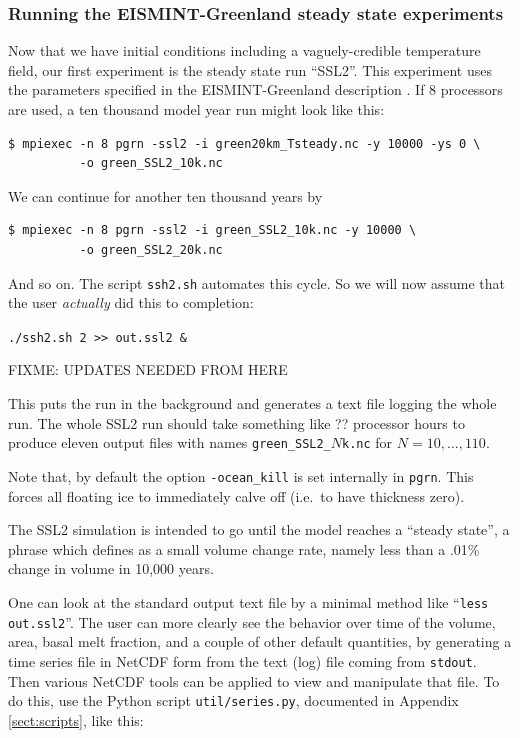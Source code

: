 \documentclass[11pt,final]{amsart}
\begin{document}
\subsubsection*{Running the EISMINT-Greenland steady state experiments}  Now that we have initial conditions including a vaguely-credible temperature field, our first experiment is the steady state run ``SSL2''.  This experiment uses the parameters specified in the EISMINT-Greenland description \cite{RitzEISMINT}.  If 8 processors are used, a ten thousand model year run might look like this:

\begin{verbatim}
$ mpiexec -n 8 pgrn -ssl2 -i green20km_Tsteady.nc -y 10000 -ys 0 \
          -o green_SSL2_10k.nc
\end{verbatim}
\noindent We can continue for another ten thousand years by
\begin{verbatim}
$ mpiexec -n 8 pgrn -ssl2 -i green_SSL2_10k.nc -y 10000 \
          -o green_SSL2_20k.nc
\end{verbatim}
\noindent And so on.   The script \verb|ssh2.sh| automates this cycle.  So we will now assume that the user \emph{actually} did this to completion:

\verb|./ssh2.sh 2 >> out.ssl2 &|

FIXME: UPDATES NEEDED FROM HERE

\noindent This puts the run in the background and generates a text file logging the whole run.  The whole SSL2 run should take something like ?? processor hours to produce eleven output files with names \verb|green_SSL2_|$N$\verb|k.nc| for $N=10,\dots,110$.

Note that, by default the option \verb|-ocean_kill| is set internally in \verb|pgrn|.  This forces all floating ice to immediately calve off (i.e.~to have thickness zero).

The SSL2 simulation is intended to go until the model reaches a ``steady state'', a phrase which \cite{RitzEISMINT} defines as a small volume change rate, namely less than a .01\% change in volume in 10,000 years.

One can look at the standard output text file by a minimal method like ``\verb|less out.ssl2|''.  The user can more clearly see the behavior over time of the volume, area, basal melt fraction, and a couple of other default quantities, by generating a time series file in NetCDF form from the text (log) file coming from \verb|stdout|.  Then various NetCDF tools can be applied to view and manipulate that file.  To do this, use the Python script \verb|util/series.py|, documented in Appendix \ref{sect:scripts}, like this:
\end{document}
